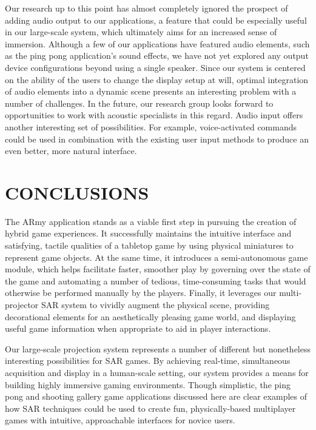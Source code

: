\documentclass{thesis}
\begin{document}
Our research up to this point has almost completely ignored the prospect of adding audio output to our applications, a feature that could be especially useful in our large-scale system, which ultimately aims for an increased sense of immersion. Although a few of our applications have featured audio elements, such as the ping pong application's sound effects, we have not yet explored any output device configurations beyond using a single speaker. Since our system is centered on the ability of the users to change the display setup at will, optimal integration of audio elements into a dynamic scene presents an interesting problem with a number of challenges. In the future, our research group looks forward to opportunities to work with acoustic specialists in this regard. Audio input offers another interesting set of possibilities. For example, voice-activated commands could be used in combination with the existing user input methods to produce an even better, more natural interface.


\chapter{CONCLUSIONS}

The ARmy application stands as a viable first step in pursuing the creation of hybrid game experiences. It successfully maintains the intuitive interface and satisfying, tactile qualities of a tabletop game by using physical miniatures to represent game objects. At the same time, it introduces a semi-autonomous game module, which helps facilitate faster, smoother play by governing over the state of the game and automating a number of tedious, time-consuming tasks that would otherwise be performed manually by the players. Finally, it leverages our multi-projector SAR system to vividly augment the physical scene, providing decorational elements for an aesthetically pleasing game world, and displaying useful game information when appropriate to aid in player interactions.

Our large-scale projection system represents a number of different but nonetheless interesting possibilities for SAR games. By achieving real-time, simultaneous acquisition and display in a human-scale setting, our system provides a means for building highly immersive gaming environments. Though simplistic, the ping pong and shooting gallery game applications discussed here are clear examples of how SAR techniques could be used to create fun, physically-based multiplayer games with intuitive, approachable interfaces for novice users.
\end{document}
